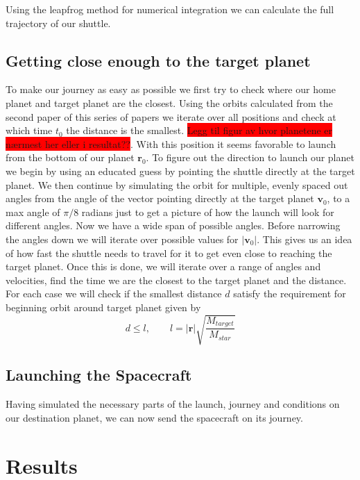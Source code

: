 \documentclass[reprint,english,notitlepage]{revtex4-2}
\begin{document}
Using the leapfrog method for numerical integration we can calculate the full trajectory of our shuttle.
\newline


\subsection{Getting close enough to the target planet}
To make our journey as easy as possible we first try to check where our home planet and target planet are the closest.
Using the orbits calculated from the second paper %
of this series of papers we iterate over all positions and check at which time $ t_{0} $ the distance is the smallest.
\colorbox{red}{Legg til figur av hvor planetene er nærmest her eller i } \colorbox{red}{resultat??}.
With this position it seems favorable to launch from the bottom of our planet $ \mathbf{r}_0 $.
To figure out the direction to launch our planet we begin by using an educated guess by pointing the shuttle directly at the target planet.
We then continue by simulating the orbit for multiple, evenly spaced out angles from the angle of the vector pointing directly at the target planet $ \mathbf{v}_0 $, to a max angle of $ \pi/8 $ radians just to get a picture of how the launch will look for different angles.
Now we have a wide span of possible angles.
Before narrowing the angles down we will iterate over possible values for $ \left\vert \mathbf{v}_0 \right\vert  $.
This gives us an idea of how fast the shuttle needs to travel for it to get even close to reaching the target planet.
Once this is done, we will iterate over a range of angles and velocities, find the time we are the closest to the target planet and the distance.
For each case we will check if the smallest distance $ d $ satisfy the requirement for beginning orbit around target planet given by
\[
d \le l, \qquad l = \left\vert \mathbf{r} \right\vert \sqrt{\frac{M_{target}}{M_{star}}}  
\]




\subsection{Launching the Spacecraft}\label{subsec:launching-the-spacecraft}
    Having simulated the necessary parts of the launch, journey and conditions on our destination planet, we can now send the spacecraft on its journey.


\section{Results} \label{sec: results}
\end{document}
